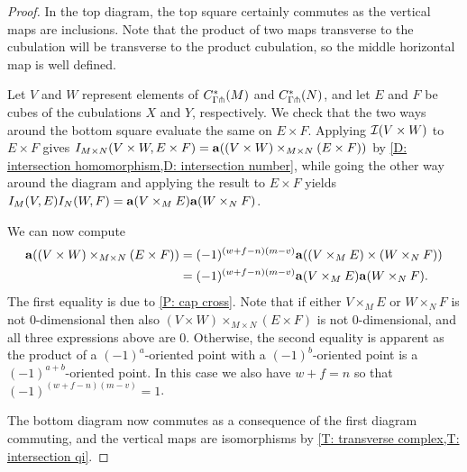 \begin{proof}
	In the top diagram, the top square certainly commutes as the vertical maps are inclusions.
	Note that the product of two maps transverse to the cubulation will be transverse to the product cubulation, so the middle horizontal map is well defined.

	Let $V$ and $W$ represent elements of $C^*_{\Gamma\pitchfork}(M)$ and $C^*_{\Gamma\pitchfork}(N)$, and let $E$ and $F$ be cubes of the cubulations $X$ and $Y$, respectively.
	We check that the two ways around the bottom square evaluate the same on $E \times F$.
	Applying $\mathcal{I}(V \times W)$ to $E \times F$ gives $I_{M \times N}(V \times W, E \times F) = \mathbf{a}((V \times W)\times_{M \times N}(E \times F))$ by \cref{D: intersection homomorphism,D: intersection number}, while going the other way around the diagram and applying the result to $E \times F$ yields $I_M(V,E)I_N(W,F) = \mathbf{a}(V \times_M E)\mathbf{a}(W \times_N F)$.

	We can now compute
	\begin{align*}
		\mathbf{a}((V \times W)\times_{M \times N}(E \times F))& = (-1)^{(w+f-n)(m-v)}\mathbf{a}((V \times_M E) \times (W \times_N F))\\
		& = (-1)^{(w+f-n)(m-v)}\mathbf{a}(V \times_M E)\mathbf{a}(W \times_N F).
	\end{align*}
	The first equality is due to \cref{P: cap cross}.
	Note that if either $V \times_M E$ or $W \times_N F$ is not $0$-dimensional then also $(V \times W)\times_{M \times N}(E \times F)$ is not $0$-dimensional, and all three expressions above are $0$.
	Otherwise, the second equality is apparent as the product of a $(-1)^a$-oriented point with a $(-1)^b$-oriented point is a $(-1)^{a+b}$-oriented point.
	In this case we also have $w+f = n$ so that $(-1)^{(w+f-n)(m-v)} = 1$.

	The bottom diagram now commutes as a consequence of the first diagram commuting, and the vertical maps are isomorphisms by \cref{T: transverse complex,T: intersection qi}.
\end{proof}

\begin{comment}
\begin{corollary}
	If $M$ and $N$ are cubulated manifolds without boundary and each $H^i(M)$ and $H^j(N)$ is finitely generated, then the cubical cohomology cross product is isomorphic to the geometric cohomology cross product.
	In particular, we have the following diagram with all vertical maps isomorphisms:
	\[
	\begin{tikzcd}
		H^*_{\Gamma}(M) \otimes H^*_{\Gamma}(N) \arrow{r}{\times} & H^*_{\Gamma}(M \times N) \\
		H^*_{\Gamma\pf}(M) \otimes H^*_{\Gamma\pf}(N) \arrow{r}{\times} \arrow[u, "\cong"] \arrow[d, "\cong", "\mc I \otimes \mc I"'] &
		H^*_{\Gamma\pf}(M \times N) \arrow[u, "\cong"] \arrow[d, "\cong", "\mc I"'] \\
		H^*(K^*(M)) \otimes H^*(K*(N)) \arrow{r}{\times} & H^*(K^*(M \times N)).
	\end{tikzcd}
	\]
\end{corollary}
\end{comment}

